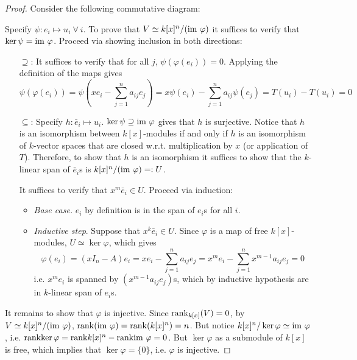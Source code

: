 \begin{proof}
    Consider the following commutative diagram:
    \clearpage
    \begin{figure}[htbp]
        \centering
    \end{figure}
    Specify $\psi: e_i \mapsto u_i \ \forall\ i$. To prove that $V \simeq k[x]^n / (\mathrm{im}\  \varphi)$ it suffices to verify that $\ker \psi = \mathrm{im}\  \varphi$. Proceed via showing inclusion in both directions:
    \begin{itemize}
        \item[$\supseteq$:] It suffices to verify that for all $j$, $\psi(\varphi(e_i)) = 0$. Applying the definition of the maps gives
        \[
            \psi(\varphi(e_i)) = \psi(xe_i - \sum\limits_{j=1}^n a_{ij} e_j) = x\psi(e_i) - \sum\limits_{j=1}^n a_{ij} \psi(e_j) = T(u_i) - T(u_i) = 0
        \]
        \item[$\subseteq$:] Specify $h: \bar{e}_i \mapsto u_i$. $\ker\psi \supseteq \mathrm{im}\  \varphi$ gives that $h$ is surjective. Notice that $h$ is an isomorphism between $k[x]$-modules if and only if $h$ is an isomorphism of $k$-vector spaces that are closed w.r.t. multiplication by $x$ (or application of $T$). Therefore, to show that $h$ is an isomorphism it suffices to show that the $k$-linear span of $\bar{e}_i$s is $k[x]^n / (\mathrm{im}\  \varphi) =: U$. 
        
        It suffices to verify that $x^m \bar{e}_i \in U$. Proceed via induction:
        \begin{itemize}
            \item \emph{Base case.} $e_i$ by definition is in the span of $e_i$s for all $i$. 
            \item \emph{Inductive step}. Suppose that $x^k \bar{e}_i \in U$. Since $\varphi$ is a map of free $k[x]$-modules, $U \simeq \ker \varphi$, which gives 
            \[
                \varphi(e_i) = (xI_n - A) e_i = xe_i - \sum_{j=1}^n a_{ij} e_j = x^m e_i - \sum_{j=1}^n x^{m-1} a_{ij} e_j = 0
            \]
            i.e. $x^m e_i$ is spanned by $(x^{m-1} a_{ij} e_j)$s, which by inductive hypothesis are in $k$-linear span of $e_i$s.
        \end{itemize}
    \end{itemize}
    It remains to show that $\varphi$ is injective. Since $\mathrm{rank}_{k[x]}(V) = 0$, by $V \simeq k[x]^n / (\mathrm{im}\  \varphi)$, $\mathrm{rank}(\mathrm{im}\ \varphi) = \mathrm{rank}(k[x]^n) = n$. But notice $k[x]^n / \ker \varphi \simeq \mathrm{im}\  \varphi$, i.e. $\mathrm{rank}{\ker \varphi} = \mathrm{rank}{k[x]^n} - \mathrm{rank}{\mathrm{im}\  \varphi} = 0$. But $\ker\varphi$ as a submodule of $k[x]$ is free, which implies that $\ker \varphi = \{0\}$, i.e. $\varphi$ is injective. 
\end{proof}

